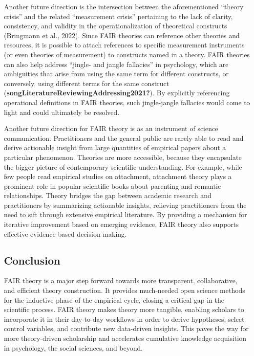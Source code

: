 \documentclass[
  man, noextraspace,floatsintext]{apa7}
\begin{document}
Another future direction is the intersection between the aforementioned ``theory crisis'' and the related ``measurement crisis'' pertaining to the lack of clarity, consistency, and validity in the operationalization of theoretical constructs (Bringmann et al., 2022).
Since FAIR theories can reference other theories and resources,
it is possible to attach references to specific measurement instruments (or even theories of measurement) to constructs named in a theory.
\label{jinglejangle}{FAIR theories can also help address ``jingle- and jangle fallacies'' in psychology,
which are ambiguities that arise from using the same term for different constructs, or conversely, using different terms for the same construct (\textbf{songLiteratureReviewingAddressing2021?}).
By explicitly referencing operational definitions in FAIR theories,
such jingle-jangle fallacies would come to light and could ultimately be resolved.}

Another future direction for FAIR theory is as an instrument of science communication. Practitioners and the general public are rarely able to read and derive actionable insight from large quantities of empirical papers about a particular phenomenon.
Theories are more accessible, because they encapsulate the bigger picture of contemporary scientific understanding.
For example, while few people read empirical studies on attachment,
attachment theory plays a prominent role in popular scientific books about parenting and romantic relationships.
Theory bridges the gap between academic research and practitioners by summarizing actionable insights, relieving practitioners from the need to sift through extensive empirical literature.
By providing a mechanism for iterative improvement based on emerging evidence, FAIR theory also supports effective evidence-based decision making.

\subsection{Conclusion}\label{conclusion}

FAIR theory is a major step forward towards more transparent, collaborative, and efficient theory construction.
It provides much-needed open science methods for the inductive phase of the empirical cycle,
closing a critical gap in the scientific process.
FAIR theory makes theory more tangible, enabling scholars to incorporate it in their day-to-day workflows in order to derive hypotheses, select control variables, and contribute new data-driven insights.
This paves the way for more theory-driven scholarship
and accelerates cumulative knowledge acquisition in psychology, the social sciences, and beyond.
\end{document}
